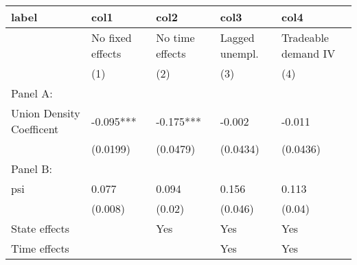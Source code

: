 \begin{table}[ht]
\centering
\begin{tabular}{lllll}
  \hline
label & col1 & col2 & col3 & col4 \\ 
  \hline
 & No fixed effects & No time effects & Lagged unempl. & Tradeable demand IV \\ 
   & (1) & (2) & (3) & (4) \\ 
  Panel A: &  &  &  &  \\ 
  Union Density Coefficent & -0.095*** & -0.175*** & -0.002 & -0.011 \\ 
   & (0.0199) & (0.0479) & (0.0434) & (0.0436) \\ 
  Panel B: &  &  &  &  \\ 
  psi & 0.077 & 0.094 & 0.156 & 0.113 \\ 
   & (0.008) & (0.02) & (0.046) & (0.04) \\ 
  State effects &  & Yes & Yes & Yes \\ 
  Time effects &  &  & Yes & Yes \\ 
   \hline
\end{tabular}
\end{table}
